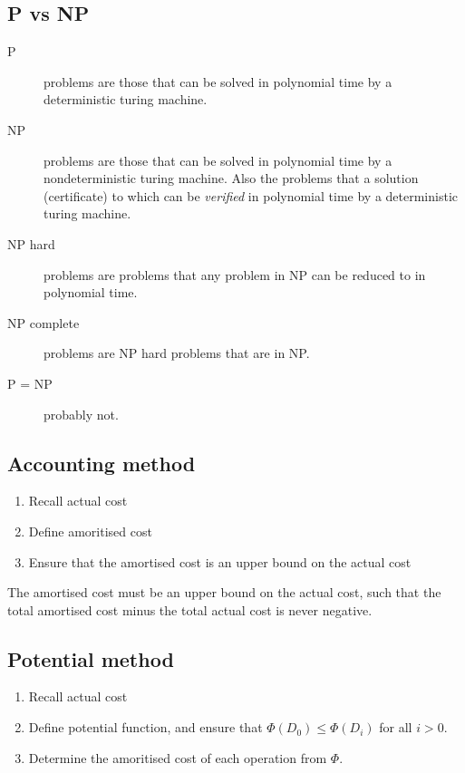 \documentclass[landscape]{cheat}
\begin{document}
\begin{multicols*}{3}
\section{P vs NP}
\begin{description}
    \item[P] problems are those that can be solved in polynomial time by a deterministic turing machine.
    \item[NP] problems are those that can be solved in polynomial time by a nondeterministic turing machine.
        Also the problems that a solution (certificate) to which can be \emph{verified} in polynomial time by a deterministic turing machine.
    \item[NP hard] problems are problems that any problem in NP can be reduced to in polynomial time.
    \item[NP complete] problems are NP hard problems that are in NP.
    \item[P = NP] probably not.
\end{description}

\subsection{Accounting method}

\begin{enumerate}
    \item Recall actual cost
    \item Define amoritised cost
    \item Ensure that the amortised cost is an upper bound on the actual cost
\end{enumerate}

The amortised cost must be an upper bound on the actual cost, such that the total amortised cost minus the total actual cost is never negative.

\subsection{Potential method}

\begin{enumerate}
    \item Recall actual cost
    \item Define potential function, and ensure that $\Phi(D_0) \leq \Phi(D_i)$ for all $i > 0$.
    \item Determine the amoritised cost of each operation from $\Phi$.
\end{enumerate}


\end{multicols*}
\end{document}
